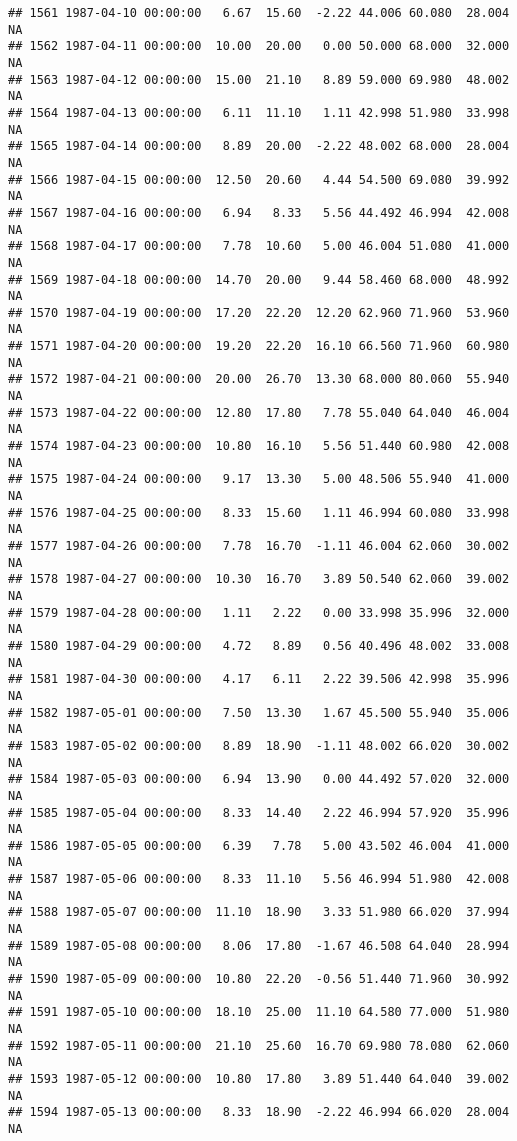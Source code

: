 \documentclass{article}\usepackage{graphicx, color}
\makeatletter
\newenvironment{kframe}{%
 \def\at@end@of@kframe{}%
 \ifinner\ifhmode%
  \def\at@end@of@kframe{\end{minipage}}%
  \begin{minipage}{\columnwidth}%
 \fi\fi%
 \def\FrameCommand##1{\hskip\@totalleftmargin \hskip-\fboxsep
 \colorbox{shadecolor}{##1}\hskip-\fboxsep
     \hskip-\linewidth \hskip-\@totalleftmargin \hskip\columnwidth}%
 \MakeFramed {\advance\hsize-\width
   \@totalleftmargin\z@ \linewidth\hsize
   \@setminipage}}%
 {\par\unskip\endMakeFramed%
 \at@end@of@kframe}
\newenvironment{knitrout}{}{} %
\makeatother
\begin{document}
\begin{knitrout}
\begin{kframe}
\begin{verbatim}
## 1561 1987-04-10 00:00:00   6.67  15.60  -2.22 44.006 60.080  28.004     NA
## 1562 1987-04-11 00:00:00  10.00  20.00   0.00 50.000 68.000  32.000     NA
## 1563 1987-04-12 00:00:00  15.00  21.10   8.89 59.000 69.980  48.002     NA
## 1564 1987-04-13 00:00:00   6.11  11.10   1.11 42.998 51.980  33.998     NA
## 1565 1987-04-14 00:00:00   8.89  20.00  -2.22 48.002 68.000  28.004     NA
## 1566 1987-04-15 00:00:00  12.50  20.60   4.44 54.500 69.080  39.992     NA
## 1567 1987-04-16 00:00:00   6.94   8.33   5.56 44.492 46.994  42.008     NA
## 1568 1987-04-17 00:00:00   7.78  10.60   5.00 46.004 51.080  41.000     NA
## 1569 1987-04-18 00:00:00  14.70  20.00   9.44 58.460 68.000  48.992     NA
## 1570 1987-04-19 00:00:00  17.20  22.20  12.20 62.960 71.960  53.960     NA
## 1571 1987-04-20 00:00:00  19.20  22.20  16.10 66.560 71.960  60.980     NA
## 1572 1987-04-21 00:00:00  20.00  26.70  13.30 68.000 80.060  55.940     NA
## 1573 1987-04-22 00:00:00  12.80  17.80   7.78 55.040 64.040  46.004     NA
## 1574 1987-04-23 00:00:00  10.80  16.10   5.56 51.440 60.980  42.008     NA
## 1575 1987-04-24 00:00:00   9.17  13.30   5.00 48.506 55.940  41.000     NA
## 1576 1987-04-25 00:00:00   8.33  15.60   1.11 46.994 60.080  33.998     NA
## 1577 1987-04-26 00:00:00   7.78  16.70  -1.11 46.004 62.060  30.002     NA
## 1578 1987-04-27 00:00:00  10.30  16.70   3.89 50.540 62.060  39.002     NA
## 1579 1987-04-28 00:00:00   1.11   2.22   0.00 33.998 35.996  32.000     NA
## 1580 1987-04-29 00:00:00   4.72   8.89   0.56 40.496 48.002  33.008     NA
## 1581 1987-04-30 00:00:00   4.17   6.11   2.22 39.506 42.998  35.996     NA
## 1582 1987-05-01 00:00:00   7.50  13.30   1.67 45.500 55.940  35.006     NA
## 1583 1987-05-02 00:00:00   8.89  18.90  -1.11 48.002 66.020  30.002     NA
## 1584 1987-05-03 00:00:00   6.94  13.90   0.00 44.492 57.020  32.000     NA
## 1585 1987-05-04 00:00:00   8.33  14.40   2.22 46.994 57.920  35.996     NA
## 1586 1987-05-05 00:00:00   6.39   7.78   5.00 43.502 46.004  41.000     NA
## 1587 1987-05-06 00:00:00   8.33  11.10   5.56 46.994 51.980  42.008     NA
## 1588 1987-05-07 00:00:00  11.10  18.90   3.33 51.980 66.020  37.994     NA
## 1589 1987-05-08 00:00:00   8.06  17.80  -1.67 46.508 64.040  28.994     NA
## 1590 1987-05-09 00:00:00  10.80  22.20  -0.56 51.440 71.960  30.992     NA
## 1591 1987-05-10 00:00:00  18.10  25.00  11.10 64.580 77.000  51.980     NA
## 1592 1987-05-11 00:00:00  21.10  25.60  16.70 69.980 78.080  62.060     NA
## 1593 1987-05-12 00:00:00  10.80  17.80   3.89 51.440 64.040  39.002     NA
## 1594 1987-05-13 00:00:00   8.33  18.90  -2.22 46.994 66.020  28.004     NA

\end{verbatim}
\end{kframe}
\end{knitrout}
\end{document}
